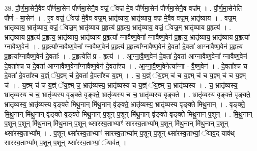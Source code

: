 \documentclass[17pt]{extarticle}
\begin{document}
38. पौ॒र्ण॒मा॒सेनै॒वैव पौ᳚र्णमा॒सेन॑ पौर्णमा॒सेनै॒व वज्रं॒ ॅवज्र॑ मे॒व पौ᳚र्णमा॒सेन॑ पौर्णमा॒सेनै॒व वज्र᳚म् । . पौ॒र्ण॒मा॒सेनेति॑ पौर्ण - मा॒सेन॑ । . ए॒व वज्रं॒ ॅवज्र॑ मे॒वैव वज्र॒म् भ्रातृ॑व्याय॒ भ्रातृ॑व्याय॒ वज्र॑ मे॒वैव वज्र॒म् भ्रातृ॑व्याय । . वज्र॒म् भ्रातृ॑व्याय॒ भ्रातृ॑व्याय॒ वज्रं॒ ॅवज्र॒म् भ्रातृ॑व्याय प्र॒हृत्य॑ प्र॒हृत्य॒ भ्रातृ॑व्याय॒ वज्रं॒ ॅवज्र॒म् भ्रातृ॑व्याय प्र॒हृत्य॑ । . भ्रातृ॑व्याय प्र॒हृत्य॑ प्र॒हृत्य॒ भ्रातृ॑व्याय॒ भ्रातृ॑व्याय प्र॒हृत्या᳚ ग्नावैष्ण॒वेना᳚ ग्नावैष्ण॒वेन॑ प्र॒हृत्य॒ भ्रातृ॑व्याय॒ भ्रातृ॑व्याय प्र॒हृत्या᳚ ग्नावैष्ण॒वेन॑ । . प्र॒हृत्या᳚ग्नावैष्ण॒वेना᳚ ग्नावैष्ण॒वेन॑ प्र॒हृत्य॑ प्र॒हृत्या᳚ग्नावैष्ण॒वेन॑ दे॒वता॑ दे॒वता॑ आग्नावैष्ण॒वेन॑ प्र॒हृत्य॑ प्र॒हृत्या᳚ग्नावैष्ण॒वेन॑ दे॒वताः᳚ । . प्र॒हृत्येति॑ प्र - हृत्य॑ । . आ॒ग्ना॒वै॒ष्ण॒वेन॑ दे॒वता॑ दे॒वता॑ आग्नावैष्ण॒वेना᳚ ग्नावैष्ण॒वेन॑ दे॒वता᳚श्च च दे॒वता॑ आग्नावैष्ण॒वेना᳚ग्नावैष्ण॒वेन॑ दे॒वता᳚श्च । . आ॒ग्ना॒वै॒ष्ण॒वेनेत्या᳚ग्ना - वै॒ष्ण॒वेन॑ । . दे॒वता᳚श्च च दे॒वता॑ दे॒वता᳚श्च य॒ज्ञ्ं ॅय॒ज्ञ्म् च॑ दे॒वता॑ दे॒वता᳚श्च य॒ज्ञ्म् । . च॒ य॒ज्ञ्ं ॅय॒ज्ञ्म् च॑ च य॒ज्ञ्म् च॑ च य॒ज्ञ्म् च॑ च य॒ज्ञ्म् च॑ । . य॒ज्ञ्म् च॑ च य॒ज्ञ्ं ॅय॒ज्ञ्म् च॒ भ्रातृ॑व्यस्य॒ भ्रातृ॑व्यस्य च य॒ज्ञ्ं ॅय॒ज्ञ्म् च॒ भ्रातृ॑व्यस्य । . च॒ भ्रातृ॑व्यस्य॒ भ्रातृ॑व्यस्य च च॒ भ्रातृ॑व्यस्य वृङ्क्ते वृङ्क्ते॒ भ्रातृ॑व्यस्य च च॒ भ्रातृ॑व्यस्य वृङ्क्ते । . भ्रातृ॑व्यस्य वृङ्क्ते वृङ्क्ते॒ भ्रातृ॑व्यस्य॒ भ्रातृ॑व्यस्य वृङ्क्ते मिथु॒नान् मि॑थु॒नान् वृ॑ङ्क्ते॒ भ्रातृ॑व्यस्य॒ भ्रातृ॑व्यस्य वृङ्क्ते मिथु॒नान् । . वृ॒ङ्क्ते॒ मि॒थु॒नान् मि॑थु॒नान् वृ॑ङ्क्ते वृङ्क्ते मिथु॒नान् प॒शून् प॒शून् मि॑थु॒नान् वृ॑ङ्क्ते वृङ्क्ते मिथु॒नान् प॒शून् । . मि॒थु॒नान् प॒शून् प॒शून् मि॑थु॒नान् मि॑थु॒नान् प॒शून् थ्सा॑रस्व॒ताभ्याꣳ॑ सारस्व॒ताभ्या᳚म् प॒शून् मि॑थु॒नान् मि॑थु॒नान् प॒शून् थ्सा॑रस्व॒ताभ्या᳚म् । . प॒शून् थ्सा॑रस्व॒ताभ्याꣳ॑ सारस्व॒ताभ्या᳚म् प॒शून् प॒शून् थ्सा॑रस्व॒ताभ्यां॒ ॅयाव॒द् याव॑थ् सारस्व॒ताभ्या᳚म् प॒शून् प॒शून् थ्सा॑रस्व॒ताभ्यां॒ ॅयाव॑त् । \newline
\end{document}

